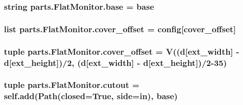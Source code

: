 \subsubsection[{base}]{\setlength{\rightskip}{0pt plus 5cm}string parts.\+Flat\+Monitor.\+base = \textquotesingle{}base\textquotesingle{}\hspace{0.3cm}{\ttfamily [static]}}\label{classparts_1_1_flat_monitor_a39d2920a0ecf49aa777c8e6a882cf137}
\hypertarget{classparts_1_1_flat_monitor_a301f413ff58034dd8afd5c9771a59edf}{}
\subsubsection[{cover\+\_\+offset}]{\setlength{\rightskip}{0pt plus 5cm}list parts.\+Flat\+Monitor.\+cover\+\_\+offset = config\mbox{[}\textquotesingle{}cover\+\_\+offset\textquotesingle{}\mbox{]}\hspace{0.3cm}{\ttfamily [static]}}\label{classparts_1_1_flat_monitor_a301f413ff58034dd8afd5c9771a59edf}
\hypertarget{classparts_1_1_flat_monitor_a070aab76902eac0b8335e2f68e0c8241}{}
\subsubsection[{cover\+\_\+offset}]{\setlength{\rightskip}{0pt plus 5cm}tuple parts.\+Flat\+Monitor.\+cover\+\_\+offset = V(({\bf d}\mbox{[}\textquotesingle{}ext\+\_\+width\textquotesingle{}\mbox{]} -\/ {\bf d}\mbox{[}\textquotesingle{}ext\+\_\+height\textquotesingle{}\mbox{]})/2, ({\bf d}\mbox{[}\textquotesingle{}ext\+\_\+width\textquotesingle{}\mbox{]} -\/ {\bf d}\mbox{[}\textquotesingle{}ext\+\_\+height\textquotesingle{}\mbox{]})/2-\/35)\hspace{0.3cm}{\ttfamily [static]}}\label{classparts_1_1_flat_monitor_a070aab76902eac0b8335e2f68e0c8241}
\hypertarget{classparts_1_1_flat_monitor_a32ee97ffa1cbb8196a5341c2864dbddb}{}
\subsubsection[{cutout}]{\setlength{\rightskip}{0pt plus 5cm}tuple parts.\+Flat\+Monitor.\+cutout = self.\+add({\bf Path}(closed=True, side=\textquotesingle{}in\textquotesingle{}), {\bf base})\hspace{0.3cm}{\ttfamily [static]}}\label{classparts_1_1_flat_monitor_a32ee97ffa1cbb8196a5341c2864dbddb}
\hypertarget{classparts_1_1_flat_monitor_aeb1da09bd78cfac34f42ed8dabe0c386}{}

